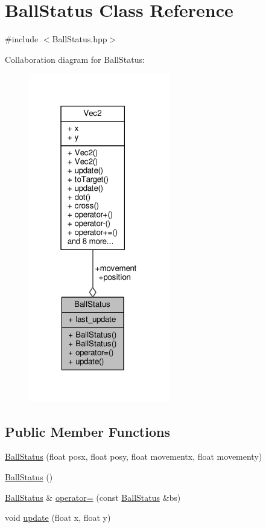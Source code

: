 \hypertarget{class_ball_status}{}\section{Ball\+Status Class Reference}
\label{class_ball_status}


{\ttfamily \#include $<$Ball\+Status.\+hpp$>$}



Collaboration diagram for Ball\+Status\+:\nopagebreak
\begin{figure}[H]
\begin{center}
\leavevmode
\includegraphics[width=175pt]{class_ball_status__coll__graph}
\end{center}
\end{figure}
\subsection*{Public Member Functions}
\begin{DoxyCompactItemize}
\item 
\hyperlink{class_ball_status_aa386a95ecc7b3968acd8f683587aa11c}{Ball\+Status} (float posx, float posy, float movementx, float movementy)
\item 
\hyperlink{class_ball_status_aa52a3da020cc2545b3c3fd8bd7944246}{Ball\+Status} ()
\item 
\hyperlink{class_ball_status}{Ball\+Status} \& \hyperlink{class_ball_status_a02508ed35c2fe08e41f99b3c1e36bffe}{operator=} (const \hyperlink{class_ball_status}{Ball\+Status} \&bs)
\item 
void \hyperlink{class_ball_status_a248375c08a18fd1d6975dd8e8bbf6923}{update} (float x, float y)
\end{DoxyCompactItemize}
